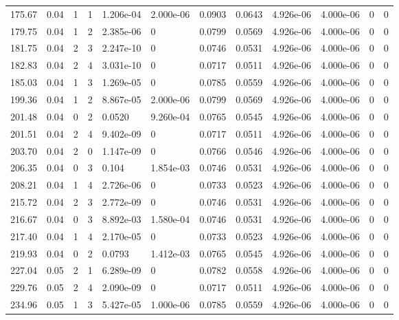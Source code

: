 \documentclass[preview]{standalone}
\begin{document}
{{{\begin{tabular}{L{1.2cm}C{1.2cm} C{0.3cm}C{0.5cm} C{1.4cm}C{1.4cm} C{1.4cm}C{1.4cm} C{1.6cm}C{1.6cm} C{1.6cm}C{1.6cm}}
  175.67  &  0.04  & 1     &  1 &  1.206e-04  & 2.000e-06  &  0.0903&   0.0643& 4.926e-06 & 4.000e-06   &  0 & 0  \\ 
  179.75  &  0.04  & 1     &  2 &  2.385e-06  & 0  &  0.0799&   0.0569& 4.926e-06 & 4.000e-06   &  0 & 0  \\ 
  181.75  &  0.04  & 2     &  3 &  2.247e-10  & 0  &  0.0746&   0.0531& 4.926e-06 & 4.000e-06   &  0 & 0  \\ 
  182.83  &  0.04  & 2     &  4 &  3.031e-10  & 0  &  0.0717&   0.0511& 4.926e-06 & 4.000e-06   &  0 & 0  \\ 
  185.03  &  0.04  & 1     &  3 &  1.269e-05  & 0  &  0.0785&   0.0559& 4.926e-06 & 4.000e-06   &  0 & 0  \\ 
  199.36  &  0.04  & 1     &  2 &  8.867e-05  & 2.000e-06  &  0.0799&   0.0569& 4.926e-06 & 4.000e-06   &  0 & 0  \\ 
  201.48  &  0.04  & 0     &  2 &  0.0520  & 9.260e-04  &  0.0765&   0.0545& 4.926e-06 & 4.000e-06   &  0 & 0  \\ 
  201.51  &  0.04  & 2     &  4 &  9.402e-09  & 0  &  0.0717&   0.0511& 4.926e-06 & 4.000e-06   &  0 & 0  \\ 
  203.70  &  0.04  & 2     &  0 &  1.147e-09  & 0  &  0.0766&   0.0546& 4.926e-06 & 4.000e-06   &  0 & 0  \\ 
  206.35  &  0.04  & 0     &  3 &  0.104  & 1.854e-03  &  0.0746&   0.0531& 4.926e-06 & 4.000e-06   &  0 & 0  \\ 
  208.21  &  0.04  & 1     &  4 &  2.726e-06  & 0  &  0.0733&   0.0523& 4.926e-06 & 4.000e-06   &  0 & 0  \\ 
  215.72  &  0.04  & 2     &  3 &  2.772e-09  & 0  &  0.0746&   0.0531& 4.926e-06 & 4.000e-06   &  0 & 0  \\ 
  216.67  &  0.04  & 0     &  3 &  8.892e-03  & 1.580e-04  &  0.0746&   0.0531& 4.926e-06 & 4.000e-06   &  0 & 0  \\ 
  217.40  &  0.04  & 1     &  4 &  2.170e-05  & 0  &  0.0733&   0.0523& 4.926e-06 & 4.000e-06   &  0 & 0  \\ 
  219.93  &  0.04  & 0     &  2 &  0.0793  & 1.412e-03  &  0.0765&   0.0545& 4.926e-06 & 4.000e-06   &  0 & 0  \\ 
  227.04  &  0.05  & 2     &  1 &  6.289e-09  & 0  &  0.0782&   0.0558& 4.926e-06 & 4.000e-06   &  0 & 0  \\ 
  229.76  &  0.05  & 2     &  4 &  2.090e-09  & 0  &  0.0717&   0.0511& 4.926e-06 & 4.000e-06   &  0 & 0  \\ 
  234.96  &  0.05  & 1     &  3 &  5.427e-05  & 1.000e-06  &  0.0785&   0.0559& 4.926e-06 & 4.000e-06   &  0 & 0  \\ 

\end{tabular}}}}
\end{document}
